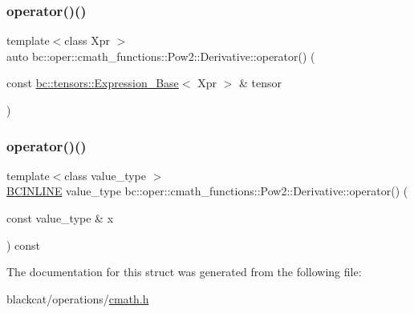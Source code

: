 \mbox{\label{structbc_1_1oper_1_1cmath__functions_1_1Pow2_1_1Derivative_a15aa4eb35d040fe95351135943ccc66c}} 
\subsubsection{\texorpdfstring{operator()()}{operator()()}\hspace{0.1cm}{\footnotesize\ttfamily [2/3]}}
{\footnotesize\ttfamily template$<$class Xpr $>$ \\
auto bc\+::oper\+::cmath\+\_\+functions\+::\+Pow2\+::\+Derivative\+::operator() (\begin{DoxyParamCaption}\item[{const \hyperlink{classbc_1_1tensors_1_1Expression__Base}{bc\+::tensors\+::\+Expression\+\_\+\+Base}$<$ Xpr $>$ \&}]{tensor }\end{DoxyParamCaption})\hspace{0.3cm}{\ttfamily [inline]}}

\mbox{\label{structbc_1_1oper_1_1cmath__functions_1_1Pow2_1_1Derivative_a3036033ca42cc0df4a146f952b4c1242}} 
\subsubsection{\texorpdfstring{operator()()}{operator()()}\hspace{0.1cm}{\footnotesize\ttfamily [3/3]}}
{\footnotesize\ttfamily template$<$class value\+\_\+type $>$ \\
\hyperlink{common_8h_a6699e8b0449da5c0fafb878e59c1d4b1}{B\+C\+I\+N\+L\+I\+NE} value\+\_\+type bc\+::oper\+::cmath\+\_\+functions\+::\+Pow2\+::\+Derivative\+::operator() (\begin{DoxyParamCaption}\item[{const value\+\_\+type \&}]{x }\end{DoxyParamCaption}) const\hspace{0.3cm}{\ttfamily [inline]}}



The documentation for this struct was generated from the following file\+:\begin{DoxyCompactItemize}
\item 
blackcat/operations/\hyperlink{cmath_8h}{cmath.\+h}\end{DoxyCompactItemize}
